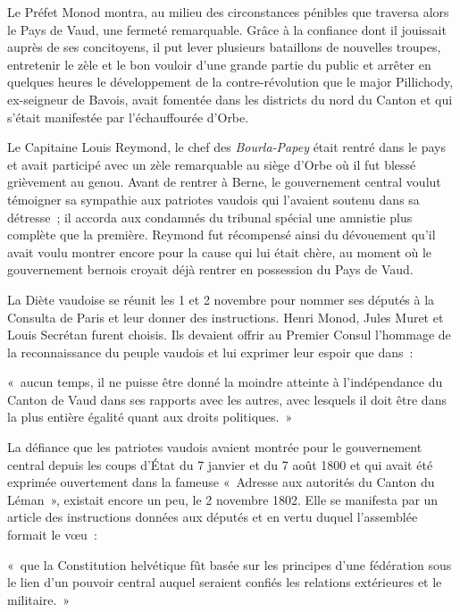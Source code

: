 \documentclass[french,twoside]{book} %
\newenvironment{quoteblock}%
  {\begin{quoting}}
  {\end{quoting}}
\newenvironment{quotebar}{%
    \def\FrameCommand{{\color{rubric!10!}\vrule width 0.5em} \hspace{0.9em}}%
    \def\OuterFrameSep{\itemsep} %
    \MakeFramed {\advance\hsize-\width \FrameRestore}
  }%
  {%
    \endMakeFramed
  }
\renewenvironment{quoteblock}%
  {%
    \savenotes
    \setstretch{0.9}
    \normalfont
    \begin{quotebar}
  }
  {%
    \end{quotebar}
    \spewnotes
  }
\begin{document}
Le Préfet Monod montra, au milieu des circonstances pénibles que traversa alors le Pays de Vaud, une fermeté remarquable. Grâce à la confiance dont il jouissait auprès de ses concitoyens, il put lever plusieurs bataillons de nouvelles troupes, entretenir le zèle et le bon vouloir d’une grande partie du public et arrêter en quelques heures le développement de la contre-révolution que le major Pillichody, ex-seigneur de Bavois, avait fomentée dans les districts du nord du Canton et qui s’était manifestée par l’échauffourée d’Orbe.\par
Le Capitaine Louis Reymond, le chef des \emph{Bourla-Papey} était rentré dans le pays et avait participé avec un zèle remarquable au siège d’Orbe où il fut blessé grièvement au genou. Avant de rentrer à Berne, le gouvernement central voulut témoigner sa sympathie aux patriotes vaudois qui l’avaient soutenu dans sa détresse ; il accorda aux condamnés du tribunal spécial une amnistie plus complète que la première. Reymond fut récompensé ainsi du dévouement qu’il avait voulu montrer encore pour la cause qui lui était chère, au moment où le gouvernement bernois croyait déjà rentrer en possession du Pays de Vaud.\par
La Diète vaudoise se réunit les 1 et 2 novembre pour nommer ses députés à la Consulta de Paris et leur donner des instructions. Henri Monod, Jules Muret et Louis Secrétan furent choisis. Ils devaient offrir au Premier Consul l’hommage de la reconnaissance du peuple vaudois et lui exprimer leur espoir que dans :\par

\begin{quoteblock}
\noindent « aucun temps, il ne puisse être donné la moindre atteinte à l’indépendance du Canton de Vaud dans ses rapports avec les autres, avec lesquels il doit être dans la plus entière égalité quant aux droits politiques. »\end{quoteblock}

\noindent La défiance que les patriotes vaudois avaient montrée pour le gouvernement central depuis les coups d’État du 7 janvier et du 7 août 1800 et qui avait été exprimée ouvertement dans la fameuse « Adresse aux autorités du Canton du Léman », existait encore un peu, le 2 novembre 1802. Elle se manifesta par un article des instructions données aux députés et en vertu duquel l’assemblée formait le vœu :\par

\begin{quoteblock}
\noindent « que la Constitution helvétique fût basée sur les principes d’une fédération sous le lien d’un pouvoir central auquel seraient confiés les relations extérieures et le militaire. »\end{quoteblock}
\end{document}
